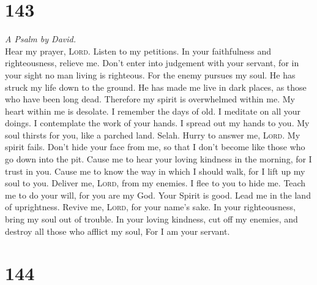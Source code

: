 \hypertarget{section-142}{%
\section{143}\label{section-142}}

\emph{A Psalm by David.}\\
 Hear my prayer, \textsc{Lord}. Listen to my petitions. In
your faithfulness and righteousness, relieve me.  Don't
enter into judgement with your servant, for in your sight no man living
is righteous.  For the enemy pursues my soul. He has
struck my life down to the ground. He has made me live in dark places,
as those who have been long dead.  Therefore my spirit is
overwhelmed within me. My heart within me is desolate.  I
remember the days of old. I meditate on all your doings. I contemplate
the work of your hands.  I spread out my hands to you. My
soul thirsts for you, like a parched land. Selah.  Hurry
to answer me, \textsc{Lord}. My spirit fails. Don't hide your face from
me, so that I don't become like those who go down into the pit.
 Cause me to hear your loving kindness in the morning, for
I trust in you. Cause me to know the way in which I should walk, for I
lift up my soul to you.  Deliver me, \textsc{Lord}, from
my enemies. I flee to you to hide me.  Teach me to do
your will, for you are my God. Your Spirit is good. Lead me in the land
of uprightness.  Revive me, \textsc{Lord}, for your
name's sake. In your righteousness, bring my soul out of trouble.
 In your loving kindness, cut off my enemies, and destroy
all those who afflict my soul, For I am your servant.

\hypertarget{section-143}{%
\section{144}\label{section-143}}

